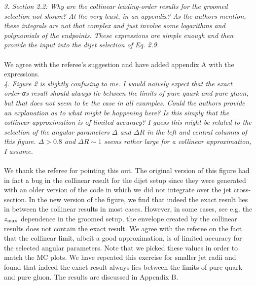 \documentclass[a4paper,11pt]{article}
\begin{document}
\noindent \textit{3. Section 2.2: Why are the collinear leading-order results for the groomed selection not shown? At the very least, in an appendix? As the authors mention, these integrals are not that complex and just involve some logarithms and polynomials of the endpoints. These expressions are simple enough and then provide the input into the dijet selection of Eq. 2.9.
}
\\
\\
We agree with the referee’s suggestion and have added appendix A with the expressions. 
\\

\noindent\textit{4. Figure 2 is slightly confusing to me. I would naively expect that the exact order-αs result should always lie between the limits of pure quark and pure gluon, but that does not seem to be the case in all examples. Could the authors provide an explanation as to what might be happening here? Is this simply that the collinear approximation is of limited accuracy? I guess this might be related to the selection of the angular parameters $\Delta$ and $\Delta R$ in the left and central columns of this figure. $\Delta>0.8$ and $\Delta R\sim1$ seems rather large for a collinear approximation, I assume.}
\\
\\
We thank the referee for pointing this out. The original version of this figure had in fact a bug in the collinear result for the dijet setup since they were generated with an older version of the code in which we did not integrate over the jet cross-section. In the new version of the figure, we find that indeed the exact result lies in between the collinear results in most cases. However, in some cases, see e.g. the $z_{\rm max}$ dependence in the groomed setup, the envelope created by the collinear results does not contain the exact result. We agree with the referee on the fact that the collinear limit, albeit a good approximation, is of limited accuracy for the selected angular parameters.  Note that we picked these values in order to match the MC plots. We have repeated this exercise for smaller jet radii and found that indeed the exact result always lies between the limits of pure quark and pure gluon. The results are discussed in Appendix B.  
\\
\end{document}

